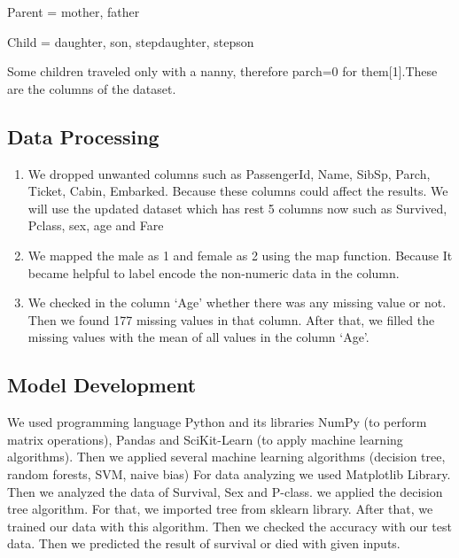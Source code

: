 \documentclass[11pt]{article} %
\begin{document}
Parent = mother, father

Child = daughter, son, stepdaughter, stepson

Some children traveled only with a nanny, therefore parch=0 for them[1].These are the columns of the dataset.

\subsection{Data Processing}
\begin{enumerate}
\item We dropped unwanted columns such as PassengerId, Name,  SibSp,  Parch,  Ticket,  Cabin,  Embarked. Because these columns could affect the results. We will use the updated dataset which has rest  5 columns now such as Survived, Pclass, sex, age and Fare
\item We mapped the male as 1 and female as 2 using the map function. Because It became helpful to label encode the non-numeric data in the column.
\item We checked in the column ‘Age’ whether there was any missing value or not.  Then we found 177 missing values in that column. After that, we filled the missing values with the mean of all values in the column ‘Age’. 
\end{enumerate}
\subsection{Model Development}
We used programming language Python and its libraries NumPy (to perform matrix operations), Pandas and SciKit-Learn (to apply machine learning algorithms). Then we applied several machine learning algorithms (decision tree, random forests, SVM, naive bias) For data analyzing we used Matplotlib Library. Then we analyzed the data of Survival, Sex and P-class.  we applied the decision tree algorithm.  For that, we imported tree from sklearn library.  After that, we trained our data with this algorithm. Then we checked the accuracy with our test data. Then we predicted the result of survival or died with given inputs. 
\end{document}
